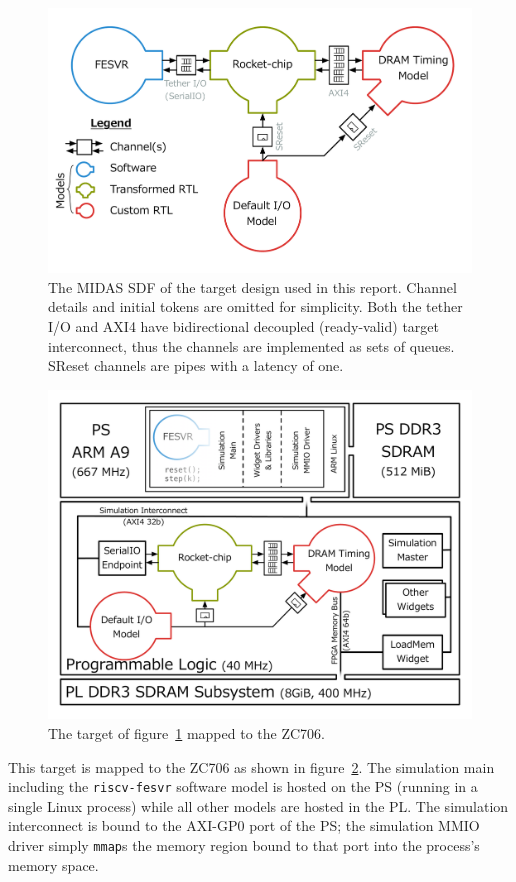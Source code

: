 \begin{figure}
	\centering
	\includegraphics[width=\textwidth]{figures/masters-target.pdf}
    \caption{The MIDAS SDF of the target design used in this report. Channel
    details and initial tokens are omitted for simplicity. Both the tether I/O
    and AXI4 have bidirectional decoupled (ready-valid) target interconnect,
    thus the channels are implemented as sets of queues. SReset channels are pipes with
    a latency of one.}
	\label{fig:default-target}
\end{figure}

\begin{figure}
	\centering
	\includegraphics[width=\textwidth]{figures/hosted-masters-target.pdf}
    \caption{The target of figure~\ref{fig:default-target} mapped to the ZC706.}
	\label{fig:hosted-masters-target}
\end{figure}

This target is mapped to the ZC706 as shown in figure~\ref{fig:hosted-masters-target}.
The simulation main including the \texttt{riscv-fesvr} software model is hosted
on the PS (running in a single Linux process) while all other models are hosted
in the PL. The simulation interconnect is bound to the AXI-GP0 port of the PS;
the simulation MMIO driver simply \texttt{mmap}s the memory region bound to that port
into the process's memory space.
